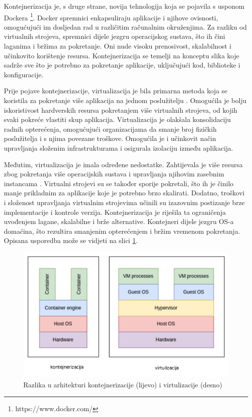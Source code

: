 \documentclass[times, utf8, diplomski]{fer}
\begin{document}
Kontejnerizacija je, s druge strane, novija tehnologija koja se pojavila s usponom Dockera \footnote{https://www.docker.com/}. Docker spremnici enkapsuliraju aplikacije i njihove ovisnosti, omogućujući im dosljedan rad u različitim računalnim okruženjima. Za razliku od virtualnih strojeva, spremnici dijele jezgru operacijskog sustava, što ih čini laganima i bržima za pokretanje. Oni nude visoku prenosivost, skalabilnost i učinkovito korištenje resursa. Kontejnerizacija se temelji na konceptu slika koje sadrže sve što je potrebno za pokretanje aplikacije, uključujući kod, biblioteke i konfiguracije.

Prije pojave kontejnerizacije, virtualizacija je bila primarna metoda koja se koristila za pokretanje više aplikacija na jednom poslužitelju \cite{combe2016docker}. Omogućila je bolju iskoristivost hardverskih resursa pokretanjem više virtualnih strojeva, od kojih svaki pokreće vlastiti skup aplikacija. Virtualizacija je olakšala konsolidaciju radnih opterećenja, omogućujući organizacijama da smanje broj fizičkih poslužitelja i s njima povezane troškove. Omogućila je i učinkovit način upravljanja složenim infrastrukturama i osigurala izolaciju između aplikacija. 

Međutim, virtualizacija je imala određene nedostatke. Zahtijevala je više resursa zbog pokretanja više operacijskih sustava i upravljanja njihovim zasebnim instancama \cite{anderson2015docker}. Virtualni strojevi su se također sporije pokretali, što ih je činilo manje prikladnim za aplikacije koje je potrebno brzo skalirati. Dodatno, troškovi i složenost upravljanja virtualnim strojevima učinili su izazovnim postizanje brze implementacije i kontrole verzija. Kontejnerizacija je riješila ta ograničenja uvođenjem lagane, skalabilne i brže alternative. Kontejneri dijele jezgru OS-a domaćina, što rezultira smanjenim opterećenjem i bržim vremenom pokretanja. Opisana usporedba može se vidjeti na slici \ref{fig:containers-vs-vms-diagram}.

\begin{figure}[htb]
\centering
\includegraphics[width=\linewidth]{img/containers-vs-vms-diagram.png}
\caption{Razlika u arhitekturi kontejnerizacije (lijevo) i virtulizacije (desno)}
\label{fig:containers-vs-vms-diagram}
\end{figure}
\end{document}

